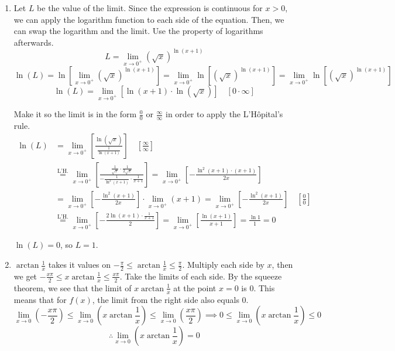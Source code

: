 \documentclass[a4paper, 12pt]{article}
\begin{document}
\begin{enumerate}[leftmargin=*,label=\textbf{\arabic*.}]
\item Let $L$ be the value of the limit. Since the expression is continuous for $x>0$, we can apply the logarithm function to each side of the equation. Then, we can swap the logarithm and the limit. Use the property of logarithms afterwards.
\[L=\lim_{x\to0^+}\left(\sqrt x\right)^{\ln\left(x+1\right)}\]
\[\ln(L)=\ln\left[\lim_{x\to0^+}\left(\sqrt x\right)^{\ln\left(x+1\right)}\right]=\lim_{x\to0^+}\ln\left[\left(\sqrt x\right)^{\ln\left(x+1\right)}\right]=\lim_{x\to0^+}\ln\left[\left(\sqrt x\right)^{\ln\left(x+1\right)}\right] \]
\[\ln\left(L\right)=\lim_{x\to0^+}\left[\ln\left(x+1\right)\cdot\ln\left(\sqrt x\right)\right] \quad\left[0\cdot\infty\right]\]

Make it so the limit is in the form $\displaystyle \frac00$ or $\displaystyle \frac\infty\infty$ in order to apply the L'Hôpital's rule.
\begin{align*}\ln\left(L\right)&=\lim_{x\to0^+}\left[\frac{\ln\left(\sqrt x\right)}{\frac1{\ln\left(x+1\right)}}\right] \quad\left[\frac\infty\infty\right]\\[1em]&\overset{\text{L'H.}}{=}\lim_{x\to0^+}\left[\frac{\frac1{\sqrt x}\cdot\frac1{2\sqrt x}}{-\frac1{\ln^2\left(x+1\right)}\cdot \frac1{x+1}}\right]=\lim_{x\to0^+}\left[-\frac{\ln^2(x+1)\cdot(x+1)}{2x}\right]\\[1em]&=\lim_{x\to0^+}\left[-\frac{\ln^2(x+1)}{2x}\right] \cdot\lim_{x\to0^+} \left(x+1\right)=\lim_{x\to0^+}\left[-\frac{\ln^2(x+1)}{2x}\right]\quad\left[\frac00\right]\\[1em]&\overset{\text{L'H.}}{=}\lim_{x\to0^+}\left[-\frac{2\ln(x+1) \cdot\frac1{x+1}}2\right]=\lim_{x\to0^+}\left[\frac{\ln(x+1)}{x+1}\right]=\frac{\ln1}{1}=0\end{align*}

$\ln(L)=0$, so $\boxed{L=1}$.

\item $\displaystyle \arctan\frac1x$ takes it values on $\displaystyle -\frac{\pi}2 \leq \arctan\frac1x \leq \frac{\pi}2$. Multiply each side by $x$, then we get $\displaystyle -\frac{x\pi}2 \leq x\arctan\frac1x \leq \frac{x\pi}2$. Take the limits of each side. By the squeeze theorem, we see that the limit of $\displaystyle x\arctan\frac1x$ at the point $x=0$ is $0$. This means that for $f(x)$, the limit from the right side also equals $0$.
\[\lim_{x\to 0}\left(-\frac{x\pi}2\right)\leq\lim_{x\to 0}\left(x\arctan\frac1x\right)\leq\lim_{x\to 0}\left(\frac{x\pi}2\right)\implies0\leq\lim_{x\to 0}\left(x\arctan\frac1x\right)\leq0\]
\[\therefore\lim_{x\to 0}\left(x\arctan\frac1x\right) = 0\]


\end{enumerate}
\end{document}
